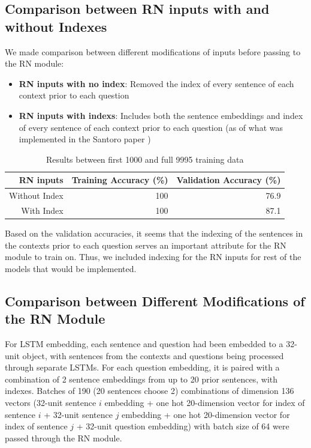 \documentclass{article}
\begin{document}
\subsection{Comparison between RN inputs with and without Indexes}

We made comparison between different modifications of inputs before passing to the RN module:

\begin{itemize}
\item \textbf{RN inputs with no index}: Removed the index of every sentence of each context prior to each question
\item \textbf{RN inputs with indexs}: Includes both the sentence embeddings and index of every sentence of each context prior to each question (as of what was implemented in the Santoro paper \cite{Santoro2017})
\end{itemize}

\begin{table}[H]

\begin{center}
\begin{tabular}{|r|r|r|}
		
\hline
\textbf{RN inputs}&\textbf{Training Accuracy (\%)}&\textbf{Validation Accuracy (\%)}\\
\hline
Without Index & 100 & 76.9\\
\hline
With Index & 100 & 87.1\\
\hline
		
\end{tabular}
\label{tab:wwoindex}
\end{center}

\caption{Results between first 1000 and full 9995 training data}
\end{table} 

Based on the validation accuracies, it seems that the indexing of the sentences in the contexts prior to each question serves an important attribute for the RN module to train on. Thus, we included indexing for the RN inputs for rest of the models that would be implemented. 




\subsection{Comparison between Different Modifications of the RN Module}

 

For LSTM embedding, each sentence and question had been embedded to a 32-unit object, with sentences from the contexts and questions being processed through separate LSTMs. For each question embedding, it is paired with a combination of 2 sentence embeddings from up to 20 prior sentences, with indexes. Batches of 190 (20 sentences choose 2) combinations of dimension 136 vectors (32-unit sentence $i$ embedding + one hot 20-dimension vector for index of sentence $i$ + 32-unit sentence $j$ embedding + one hot 20-dimension vector for index of sentence $j$ + 32-unit question embedding) with batch size of 64 were passed through the RN module.
\end{document}
